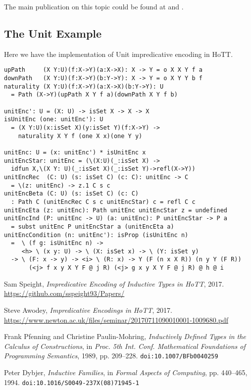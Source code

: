 \documentclass{article}
\theoremstyle{definition}
\begin{document}
The main publication on this topic could be found at \cite{Awodey17} and \cite{Speight17}.

\subsection{The Unit Example}

Here we have the implementation of Unit impredicative encoding in HoTT.

\begin{lstlisting}[mathescape=true]
upPath     (X Y:U)(f:X->Y)(a:X->X): X -> Y = o X X Y f a
downPath   (X Y:U)(f:X->Y)(b:Y->Y): X -> Y = o X Y Y b f
naturality (X Y:U)(f:X->Y)(a:X->X)(b:Y->Y): U
  = Path (X->Y)(upPath X Y f a)(downPath X Y f b)

unitEnc': U = (X: U) -> isSet X -> X -> X
isUnitEnc (one: unitEnc'): U
  = (X Y:U)(x:isSet X)(y:isSet Y)(f:X->Y) ->
    naturality X Y f (one X x)(one Y y)

unitEnc: U = (x: unitEnc') * isUnitEnc x
unitEncStar: unitEnc = (\(X:U)(_:isSet X) ->
  idfun X,\(X Y: U)(_:isSet X)(_:isSet Y)->refl(X->Y))
unitEncRec  (C: U) (s: isSet C) (c: C): unitEnc -> C
  = \(z: unitEnc) -> z.1 C s c
unitEncBeta (C: U) (s: isSet C) (c: C)
  : Path C (unitEncRec C s c unitEncStar) c = refl C c
unitEncEta (z: unitEnc): Path unitEnc unitEncStar z = undefined
unitEncInd (P: unitEnc -> U) (a: unitEnc): P unitEncStar -> P a
  = subst unitEnc P unitEncStar a (unitEncEta a)
unitEncCondition (n: unitEnc'): isProp (isUnitEnc n)
  =  \ (f g: isUnitEnc n) ->
     <h> \ (x y: U) -> \ (X: isSet x) -> \ (Y: isSet y)
  -> \ (F: x -> y) -> <i> \ (R: x) -> Y (F (n x X R)) (n y Y (F R))
       (<j> f x y X Y F @ j R) (<j> g x y X Y F @ j R) @ h @ i
\end{lstlisting}

\begin{thebibliography}{99}

Sam Speight,
\textit{Impredicative Encoding of Inductive Types in HoTT},
2017.
\url{https://github.com/sspeight93/Papers/}

Steve Awodey,
\textit{Impredicative Encodings in HoTT},
2017.
\url{https://www.newton.ac.uk/files/seminar/20170711090010001-1009680.pdf}

Frank Pfenning and Christine Paulin-Mohring,
\textit{Inductively Defined Types in the Calculus of Constructions},
in \textit{Proc. 5th Int. Conf. Mathematical Foundations of Programming Semantics}, 1989, pp. 209–228.
\texttt{doi:10.1007/BFb0040259}

Peter Dybjer,
\textit{Inductive Families},
in \textit{Formal Aspects of Computing},
pp. 440–465, 1994.
\texttt{doi:10.1016/S0049-237X(08)71945-1}

\end{thebibliography}
\end{document}
